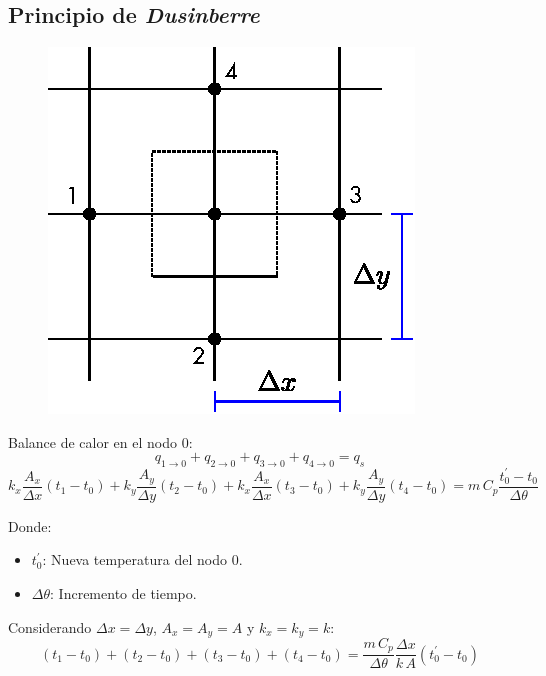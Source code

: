 \subsection{Principio de \emph{Dusinberre}}
\begin{figure}[!h]
\centering
\includegraphics[scale=1.20]{figura03_08.eps}
\end{figure}

Balance de calor en el nodo $0$:
\begin{equation*}
    q_{1\rightarrow 0}+
    q_{2\rightarrow 0}+
    q_{3\rightarrow 0}+
    q_{4\rightarrow 0}=
    q_s
\end{equation*}
\begin{equation*}
    k_x\frac{A_x}{\Delta x}(t_1-t_0)+
    k_y\frac{A_y}{\Delta y}(t_2-t_0)+
    k_x\frac{A_x}{\Delta x}(t_3-t_0)+
    k_y\frac{A_y}{\Delta y}(t_4-t_0)=
    m\,C_p\frac{t_0^{'}-t_0}{\Delta\theta}
\end{equation*}

Donde:
\begin{itemize}
    \item $t_0^{'}$: Nueva temperatura del nodo $0$.
    \item $\Delta\theta$: Incremento de tiempo.
\end{itemize}

Considerando $\Delta x=\Delta y$, $A_x=A_y=A$ y $k_x=k_y=k$:
\begin{equation*}
    (t_1-t_0)+
    (t_2-t_0)+
    (t_3-t_0)+
    (t_4-t_0)=
    \frac{m\,C_p}{\Delta\theta}\frac{\Delta x}{k\,A}(t_0^{'}-t_0)
\end{equation*}

